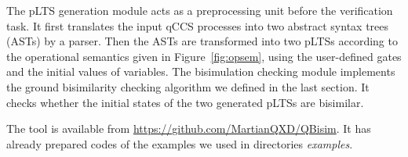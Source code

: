 \documentclass[a4paper,UKenglish,cleveref, autoref]{lipics-v2019}
\begin{document}
The pLTS generation module acts as a preprocessing unit before the verification task. It first translates the input qCCS processes  into two abstract syntax trees (ASTs) by a parser. Then the ASTs are transformed into two pLTSs according to the operational semantics given in Figure~\ref{fig:opsem}, using the user-defined gates and the initial values of variables.
%
The  bisimulation checking module  implements the ground bisimilarity checking algorithm we defined in the last section. It checks whether the initial states of the two generated pLTSs are bisimilar. 

The tool is available from \url{https://github.com/MartianQXD/QBisim}. It has already prepared codes of the examples we used in directories \textsl{examples}.
\end{document}
